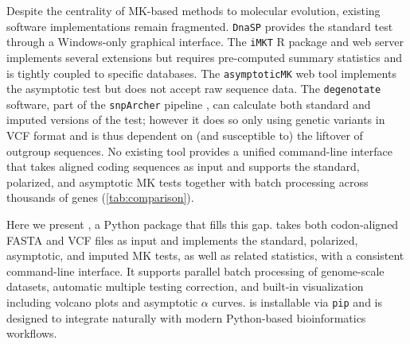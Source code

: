 Despite the centrality of MK-based methods to molecular evolution,
existing software implementations remain fragmented.
\texttt{DnaSP} \citep{librado2009} provides the standard test
through a Windows-only graphical interface.
The \texttt{iMKT} R package and web server \citep{murga-moreno2019}
implements several extensions
but requires pre-computed summary statistics
and is tightly coupled to specific databases.
The \texttt{asymptoticMK} web tool \citep{haller2017}
implements the asymptotic test
but does not accept raw sequence data.
The \texttt{degenotate} software, part of the \texttt{snpArcher}
pipeline \cite{mirchandani2023}, can calculate both standard and 
imputed versions of the test; however it does so only using
genetic variants in VCF format and is thus dependent on
(and susceptible to) the liftover of outgroup sequences.
No existing tool provides a unified command-line interface
that takes aligned coding sequences as input
and supports the standard, polarized, and asymptotic MK tests
together with batch processing across thousands of genes
(\cref{tab:comparison}).

Here we present \mkado, a Python package that fills this gap.
\mkado takes both codon-aligned FASTA and VCF files as input
and implements the standard, polarized, asymptotic,
and imputed MK tests,
as well as related statistics,
with a consistent command-line interface.
It supports parallel batch processing of genome-scale datasets,
automatic multiple testing correction,
and built-in visualization
including volcano plots and asymptotic $\alpha$ curves.
\mkado is installable via \texttt{pip}
and is designed to integrate naturally
with modern Python-based bioinformatics workflows.

